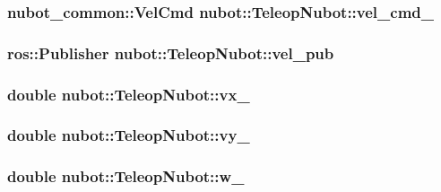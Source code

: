 \hypertarget{classnubot_1_1TeleopNubot_adb1261f7f5a4271dc617f39320607a58}{
\subsubsection[{vel\-\_\-cmd\-\_\-}]{\setlength{\rightskip}{0pt plus 5cm}nubot\-\_\-common\-::\-Vel\-Cmd nubot\-::\-Teleop\-Nubot\-::vel\-\_\-cmd\-\_\-\hspace{0.3cm}{\ttfamily [private]}}}\label{classnubot_1_1TeleopNubot_adb1261f7f5a4271dc617f39320607a58}
\hypertarget{classnubot_1_1TeleopNubot_a9ad97f610c49b200d1d28d70c2162cc8}{
\subsubsection[{vel\-\_\-pub}]{\setlength{\rightskip}{0pt plus 5cm}ros\-::\-Publisher nubot\-::\-Teleop\-Nubot\-::vel\-\_\-pub\hspace{0.3cm}{\ttfamily [private]}}}\label{classnubot_1_1TeleopNubot_a9ad97f610c49b200d1d28d70c2162cc8}
\hypertarget{classnubot_1_1TeleopNubot_a92b17e7ba44e3ddbfef69fe86ea4f98a}{
\subsubsection[{vx\-\_\-}]{\setlength{\rightskip}{0pt plus 5cm}double nubot\-::\-Teleop\-Nubot\-::vx\-\_\-\hspace{0.3cm}{\ttfamily [private]}}}\label{classnubot_1_1TeleopNubot_a92b17e7ba44e3ddbfef69fe86ea4f98a}
\hypertarget{classnubot_1_1TeleopNubot_abd5b72b05fb96eb0124f0ad8b75024bf}{
\subsubsection[{vy\-\_\-}]{\setlength{\rightskip}{0pt plus 5cm}double nubot\-::\-Teleop\-Nubot\-::vy\-\_\-\hspace{0.3cm}{\ttfamily [private]}}}\label{classnubot_1_1TeleopNubot_abd5b72b05fb96eb0124f0ad8b75024bf}
\hypertarget{classnubot_1_1TeleopNubot_a110d8e399db727c159a28b177bf83440}{
\subsubsection[{w\-\_\-}]{\setlength{\rightskip}{0pt plus 5cm}double nubot\-::\-Teleop\-Nubot\-::w\-\_\-\hspace{0.3cm}{\ttfamily [private]}}}\label{classnubot_1_1TeleopNubot_a110d8e399db727c159a28b177bf83440}


